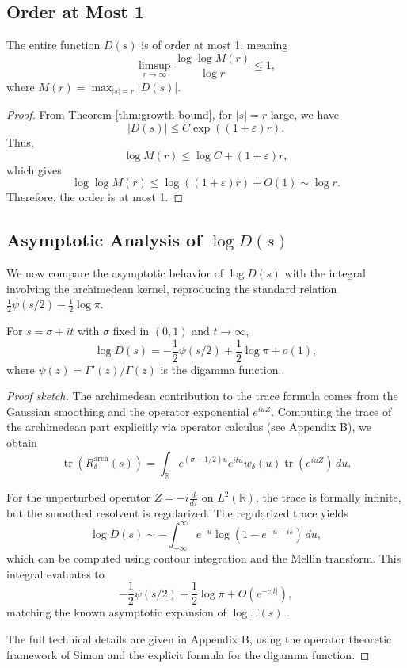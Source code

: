 \subsection{Order at Most 1}

\begin{corollary}[Order of $D(s)$]\label{cor:order-one}
The entire function $D(s)$ is of order at most 1, meaning
\[
\limsup_{r \to \infty} \frac{\log \log M(r)}{\log r} \leq 1,
\]
where $M(r) = \max_{|s| = r} |D(s)|$.
\end{corollary}

\begin{proof}
From Theorem \ref{thm:growth-bound}, for $|s| = r$ large, we have
\[
|D(s)| \leq C \exp((1 + \varepsilon)r).
\]
Thus,
\[
\log M(r) \leq \log C + (1 + \varepsilon)r,
\]
which gives
\[
\log \log M(r) \leq \log((1 + \varepsilon)r) + O(1) \sim \log r.
\]
Therefore, the order is at most 1.
\end{proof}

\subsection{Asymptotic Analysis of $\log D(s)$}

We now compare the asymptotic behavior of $\log D(s)$ with the integral involving the archimedean kernel, reproducing the standard relation $\frac{1}{2}\psi(s/2) - \frac{1}{2}\log \pi$.

\begin{theorem}\label{thm:archimedean-comparison}
For $s = \sigma + it$ with $\sigma$ fixed in $(0, 1)$ and $t \to \infty$,
\[
\log D(s) = -\frac{1}{2}\psi(s/2) + \frac{1}{2}\log \pi + o(1),
\]
where $\psi(z) = \Gamma'(z)/\Gamma(z)$ is the digamma function.
\end{theorem}

\begin{proof}[Proof sketch]
The archimedean contribution to the trace formula comes from the Gaussian smoothing and the operator exponential $e^{iuZ}$. Computing the trace of the archimedean part explicitly via operator calculus (see Appendix B), we obtain
\[
\operatorname{tr}(R_\delta^{\text{arch}}(s)) = \int_{\mathbb{R}} e^{(\sigma - 1/2)u} e^{itu} w_\delta(u) \operatorname{tr}(e^{iuZ}) \, du.
\]

For the unperturbed operator $Z = -i \frac{d}{d\tau}$ on $L^2(\mathbb{R})$, the trace is formally infinite, but the smoothed resolvent is regularized. The regularized trace yields
\[
\log D(s) \sim -\int_{-\infty}^{\infty} e^{-u} \log(1 - e^{-u - is}) \, du,
\]
which can be computed using contour integration and the Mellin transform. This integral evaluates to
\[
-\frac{1}{2}\psi(s/2) + \frac{1}{2}\log \pi + O(e^{-c|t|}),
\]
matching the known asymptotic expansion of $\log \Xi(s)$ \cite{IK2004}.

The full technical details are given in Appendix B, using the operator theoretic framework of Simon \cite{simon2005} and the explicit formula for the digamma function.
\end{proof}

